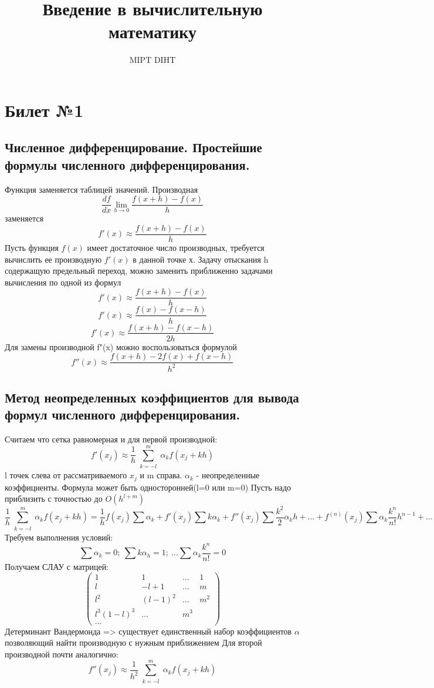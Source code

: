 \documentclass[a4paper]{article}
\title{Введение в вычислительную математику}
\author{MIPT DIHT}
\begin{document}
\maketitle

\section{Билет №1}
\subsection{Численное дифференцирование. Простейшие формулы численного дифференцирования.}
Функция заменяется таблицей значений. Производная $$\frac{df}{dx} \lim_{h \to 0} \frac{f(x + h) - f(x)}{h}$$ заменяется $$f'(x) \approx \frac{f(x + h) - f(x)}{h}$$
Пусть функция $f(x)$ имеет достаточное число производных, требуется вычислить ее производную $f'(x)$ в данной точке х. Задачу отыскания h содержащую предельный переход, можно заменить приближенно задачами вычисления по одной из формул
$$f'(x) \approx \frac{f(x + h) - f(x)}{h}$$
$$f'(x) \approx \frac{f(x) - f(x - h)}{h}$$
$$f'(x) \approx \frac{f(x + h) - f(x - h)}{2h}$$
Для замены производной f"(x) можно воспользоваться формулой
$$f''(x) \approx \frac{f(x + h) - 2f(x) + f(x - h)}{h^2}$$

\subsection{Метод неопределенных коэффициентов для вывода формул численного дифференцирования.}
Считаем что сетка равномерная и для первой производной:
$$ f'(x_j) \approx \frac{1}{h} \sum_{\substack{k=-l}}^m \alpha_k f(x_j +kh)$$
l точек слева от рассматриваемого $x_j$ и m справа. $\alpha_k$ - неопределенные коэффициенты. Формула может быть односторонней(l=0 или m=0)
Пусть надо приблизить с точностью до $O(h^{l+m})$
$$ \frac{1}{h} \sum_{\substack{k=-l}}^m \alpha_k f(x_j+kh) = \frac{1}{h}f(x_j)\sum \alpha_k + f'(x_j)\sum k\alpha_k + f''(x_j)\sum \frac{k^2}{2}\alpha_kh + \ldots + f^{(n)}(x_j) \sum \alpha_k \frac{k^n}{n!} h^{n-1} + \ldots$$
Требуем выполнения условий:
$$ \sum \alpha_k = 0;\ \sum k\alpha_h = 1;\ \ldots \sum \alpha_k \frac{k^n}{n!}=0 $$
Получаем СЛАУ с матрицей:
$$ \begin{pmatrix}
1 & 1 & \ldots & 1 \\
l & -l+1 & \ldots & m \\
l^2 & (l-1)^2 & \ldots & m^2 \\
l^3 (1-l)^3 & \ldots & m^3 \\
\ldots
\end{pmatrix}$$
Детерминант Вандермонда => существует единственный набор коэффициентов $\alpha$ позволяющий найти производную с нужным приближением
Для второй производной почти аналогично:
$$ f''(x_j) \approx \frac{1}{h^2} \sum_{\substack{k=-l}}^m \alpha_k f(x_j +kh)$$
\end{document}
